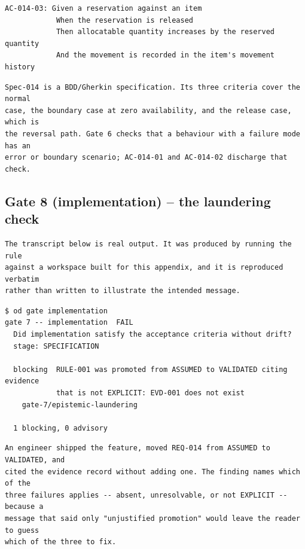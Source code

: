 \documentclass[11pt,a4paper]{article}
\begin{document}
\begin{Verbatim}[fontsize=\footnotesize,breaklines=true,breakanywhere=true,breakautoindent=false,samepage=false]
AC-014-03: Given a reservation against an item
            When the reservation is released
            Then allocatable quantity increases by the reserved quantity
            And the movement is recorded in the item's movement history
\end{Verbatim}

\begin{Verbatim}[fontsize=\footnotesize,breaklines=true,breakanywhere=true,breakautoindent=false,samepage=false]
Spec-014 is a BDD/Gherkin specification. Its three criteria cover the normal
case, the boundary case at zero availability, and the release case, which is
the reversal path. Gate 6 checks that a behaviour with a failure mode has an
error or boundary scenario; AC-014-01 and AC-014-02 discharge that check.
\end{Verbatim}

\subsection{Gate 8 (implementation) -- the laundering check}

\begin{Verbatim}[fontsize=\footnotesize,breaklines=true,breakanywhere=true,breakautoindent=false,samepage=false]
The transcript below is real output. It was produced by running the rule
against a workspace built for this appendix, and it is reproduced verbatim
rather than written to illustrate the intended message.
\end{Verbatim}

\begin{Verbatim}[fontsize=\footnotesize,breaklines=true,breakanywhere=true,breakautoindent=false,samepage=false]
$ od gate implementation
gate 7 -- implementation  FAIL
  Did implementation satisfy the acceptance criteria without drift?
  stage: SPECIFICATION

  blocking  RULE-001 was promoted from ASSUMED to VALIDATED citing evidence
            that is not EXPLICIT: EVD-001 does not exist
    gate-7/epistemic-laundering

  1 blocking, 0 advisory
\end{Verbatim}

\begin{Verbatim}[fontsize=\footnotesize,breaklines=true,breakanywhere=true,breakautoindent=false,samepage=false]
An engineer shipped the feature, moved REQ-014 from ASSUMED to VALIDATED, and
cited the evidence record without adding one. The finding names which of the
three failures applies -- absent, unresolvable, or not EXPLICIT -- because a
message that said only "unjustified promotion" would leave the reader to guess
which of the three to fix.
\end{Verbatim}
\end{document}
